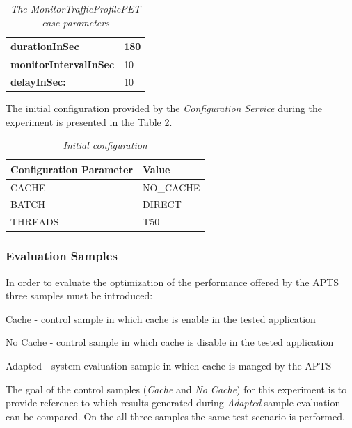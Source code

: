 \documentclass[10pt,a4paper]{article}
\let\tempone\itemize
\let\temptwo\enditemize
\renewenvironment{itemize}{\tempone\addtolength{\itemsep}{-0.4\baselineskip}}{\temptwo}
\begin{document}
\begin{table}[!htb]
\def\arraystretch{1.5}
\caption{\textit{The MonitorTrafficProfilePET case parameters}} \label{evaluationtestconf}
\begin{tabularx}{\textwidth}{X|X}

\textbf{durationInSec} & 180 \\ \hline
\textbf{monitorIntervalInSec} & 10 \\ \hline
\textbf{delayInSec:} & 10\\
\end{tabularx}
\end{table}

The initial configuration provided by the \textit{Configuration Service} during the experiment is presented in the Table \ref{cacheinitconf}.
\begin{table}[!htb]
\caption{\textit{Initial configuration}} \label{cacheinitconf}
\begin{tabularx}{\textwidth}{X|X}
\textbf{Configuration Parameter} & \textbf{Value} \\ \hline
CACHE & NO\_CACHE \\ \hline
BATCH & DIRECT\\ \hline
THREADS & T50\\
\end{tabularx}
\end{table}


\subsubsection{Evaluation Samples} \label{evaluationsamplescache}

In order to evaluate the optimization of the performance offered by the APTS three  samples must be introduced: 
\begin{itemize}
\item Cache - control sample in which cache is enable in the tested application
\item No Cache - control sample in which cache is disable in the tested application
\item Adapted - system evaluation sample in which cache is manged by the APTS
\end{itemize}

The goal of the control samples (\textit{Cache} and \textit{No Cache}) for this experiment is to provide reference to which results generated during \textit{Adapted} sample evaluation can be compared. On the all three samples the same test scenario is performed. 
\end{document}
